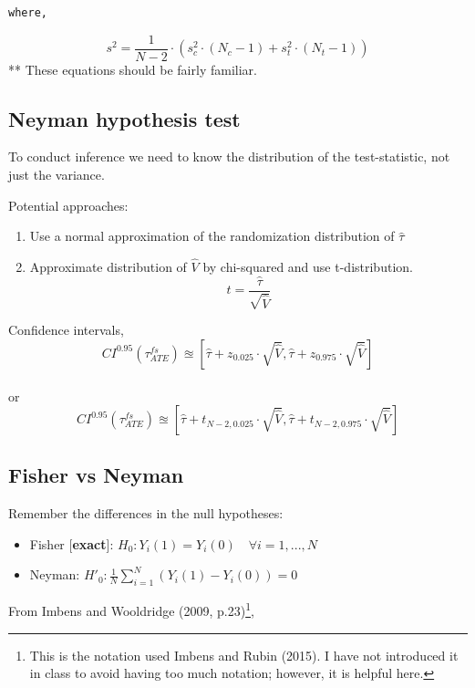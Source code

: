 \documentclass[
  letterpaper,
  DIV=11,
  numbers=noendperiod]{scrreprt}
\providecommand{\tightlist}{%
  \setlength{\itemsep}{0pt}\setlength{\parskip}{0pt}}\usepackage{longtable,booktabs,array}
\theoremstyle{definition}
\theoremstyle{remark}
\begin{document}
\begin{verbatim}
where, 
\end{verbatim}

\[
        s^2 = \frac{1}{N-2}\cdot\left(s^2_c\cdot(N_c-1)+s^2_t\cdot(N_t-1)\right)
\] ** These equations should be fairly familiar.

\subsection{Neyman hypothesis test}\label{neyman-hypothesis-test}

To conduct inference we need to know the distribution of the
test-statistic, not just the variance.

Potential approaches:

\begin{enumerate}
\def\labelenumi{\arabic{enumi}.}
\tightlist
\item
  Use a normal approximation of the randomization distribution of
  \(\hat{\tau}\)
\item
  Approximate distribution of \(\hat{V}\) by chi-squared and use
  t-distribution. \[
        t = \frac{\hat{\tau}}{\sqrt{\hat{V}}}
  \]
\end{enumerate}

Confidence intervals, \[
    CI^{0.95}(\tau^{fs}_{ATE}) \approxeq \left[\hat{\tau}+z_{0.025}\cdot\sqrt{\hat{V}},\hat{\tau}+z_{0.975}\cdot\sqrt{\hat{V}}\right]
\]\\
or \[
        CI^{0.95}(\tau^{fs}_{ATE}) \approxeq \left[\hat{\tau}+t_{N-2,0.025}\cdot\sqrt{\hat{V}},\hat{\tau}+t_{N-2,0.975}\cdot\sqrt{\hat{V}}\right]
\]

\subsection{Fisher vs Neyman}\label{fisher-vs-neyman-1}

Remember the differences in the null hypotheses:

\par

\begin{itemize}
\tightlist
\item
  Fisher {[}\textbf{exact}{]}:
  \(H_0: Y_i(1)=Y_i(0) \quad\forall i=1,...,N\)
\item
  Neyman: \(H'_0: \frac{1}{N}\sum_{i=1}^{N}(Y_i(1)-Y_i(0))=0\)
\end{itemize}

From Imbens and Wooldridge (2009, p.23)\footnote{This is the notation
  used Imbens and Rubin (2015). I have not introduced it in class to
  avoid having too much notation; however, it is helpful here.},
\end{document}
